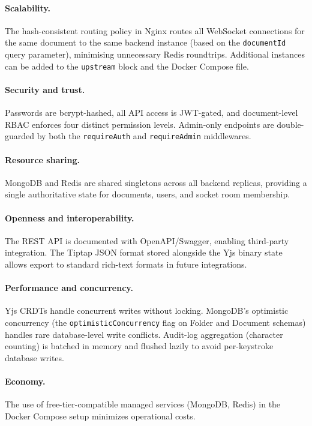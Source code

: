 \documentclass{scrartcl}
\begin{document}
  \paragraph{Scalability.}
  The hash-consistent routing policy in Nginx routes all WebSocket connections for the same
  document to the same backend instance (based on the \texttt{documentId} query parameter),
  minimising unnecessary Redis roundtrips. Additional instances can be added to the
  \texttt{upstream} block and the Docker Compose file.

  \paragraph{Security and trust.}
  Passwords are bcrypt-hashed, all API access is JWT-gated, and document-level RBAC enforces
  four distinct permission levels. Admin-only endpoints are double-guarded by both the
  \texttt{requireAuth} and \texttt{requireAdmin} middlewares.

  \paragraph{Resource sharing.}
  MongoDB and Redis are shared singletons across all backend replicas, providing a single
  authoritative state for documents, users, and socket room membership.

  \paragraph{Openness and interoperability.}
  The REST API is documented with OpenAPI/Swagger, enabling third-party integration. The
  Tiptap JSON format stored alongside the Yjs binary state allows export to standard rich-text
  formats in future integrations.

  \paragraph{Performance and concurrency.}
  Yjs CRDTs handle concurrent writes without locking. MongoDB's optimistic concurrency
  (the \texttt{optimisticConcurrency} flag on Folder and Document schemas) handles rare
  database-level write conflicts. Audit-log aggregation (character counting) is batched in
  memory and flushed lazily to avoid per-keystroke database writes.

  \paragraph{Economy.}
  The use of free-tier-compatible managed services (MongoDB, Redis) in the Docker Compose
  setup minimizes operational costs.
\end{document}
